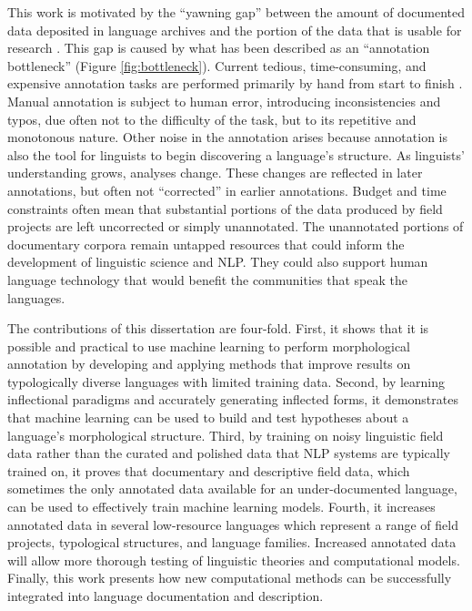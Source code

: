 This work is motivated by the “yawning gap” between the amount of documented data deposited in language archives and the portion of the data that is usable for research \citep{seifart_language_2018}. This gap is caused by what has been described as an ``annotation bottleneck'' (Figure \ref{fig:bottleneck}). Current tedious, time-consuming, and expensive annotation tasks are performed primarily by hand from start to finish \citep{simons_worlds_2013,holton_developing_2017}. Manual annotation is subject to human error, introducing inconsistencies and typos, due often not to the difficulty of the task, but to its repetitive and monotonous nature. Other noise in the annotation arises because annotation is also the tool for linguists to begin discovering a language's structure. As linguists' understanding grows, analyses change. These changes are reflected in later annotations, but often not ``corrected'' in earlier annotations.
Budget and time constraints often mean that substantial portions of the data produced by field projects are left uncorrected or simply unannotated. The unannotated portions of documentary corpora remain untapped resources that could inform the development of linguistic science and NLP. They could also support human language technology that would benefit the communities that speak the languages. 

The contributions of this dissertation are four-fold. First, it shows that it is possible and practical to use machine learning to perform morphological annotation by developing and applying methods that improve results on typologically diverse languages with limited training data. Second, by learning inflectional paradigms and accurately generating inflected forms, it demonstrates that machine learning can be used to build and test hypotheses about a language's morphological structure. Third, by training on noisy linguistic field data rather than the curated and polished data that NLP systems are typically trained on, it proves that documentary and descriptive field data, which sometimes the only annotated data available for an under-documented language, can be used to effectively train machine learning models. 
Fourth, it increases annotated data in several low-resource languages which represent a range of field projects, typological structures, and language families. Increased annotated data will allow more thorough testing of linguistic theories and computational models.
Finally, this work presents how new computational methods can be successfully integrated into language documentation and description. 

